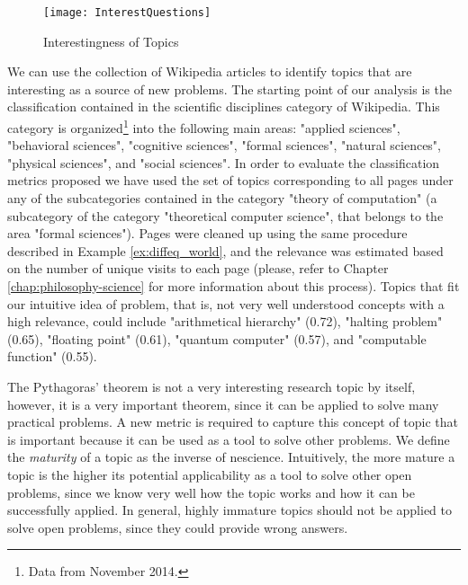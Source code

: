 \begin{figure}[h]
\centering\texttt{[image: InterestQuestions]}
\caption{\label{fig:Interestingness-Questions}Interestingness of Topics}
\end{figure}

\begin{example}
\label{ex:wikipedia-problems}
We can use the collection of Wikipedia articles to identify topics that are interesting as a source of new problems. The starting point of our analysis is the classification contained in the scientific disciplines category of Wikipedia. This category is organized\footnote{Data from November 2014.} into the following main areas: "applied sciences", "behavioral sciences", "cognitive sciences", "formal sciences", "natural sciences", "physical sciences", and "social sciences". In order to evaluate the classification metrics proposed we have used the set of topics corresponding to all pages under any of the subcategories contained in the category "theory of computation" (a subcategory of the category "theoretical computer science", that belongs to the area "formal sciences"). Pages were cleaned up using the same procedure described in Example \ref{ex:diffeq_world}, and the relevance was estimated based on the number of unique visits to each page (please, refer to Chapter \ref{chap:philosophy-science} for more information about this process). Topics that fit our intuitive idea of problem, that is, not very well understood concepts with a high relevance, could include "arithmetical hierarchy" (0.72), "halting problem" (0.65), "floating point" (0.61), "quantum computer" (0.57), and "computable function" (0.55).
\end{example}

The Pythagoras' theorem is not a very interesting research topic by itself, however, it is a very important theorem, since it can be applied to solve many practical problems. A new metric is required to capture this concept of topic that is important because it can be used as a tool to solve other problems. We define the \emph{maturity} of a topic as the inverse of nescience. Intuitively, the more mature a topic is the higher its potential applicability as a tool to solve other open problems, since we know very well how the topic works and how it can be successfully applied. In general, highly immature topics should not be applied to solve open problems, since they could provide wrong answers.

